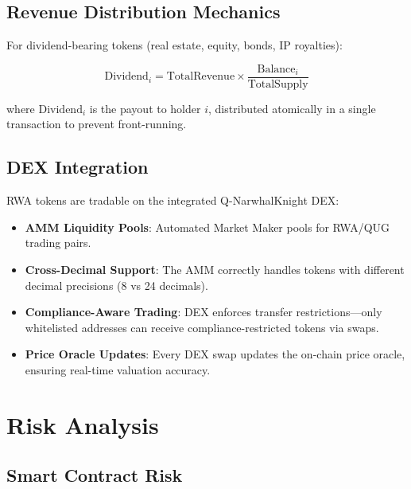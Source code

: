 \documentclass[11pt,a4paper,twoside]{article}
\begin{document}
\subsection{Revenue Distribution Mechanics}

For dividend-bearing tokens (real estate, equity, bonds, IP royalties):

\begin{equation}
\text{Dividend}_i = \text{TotalRevenue} \times \frac{\text{Balance}_i}{\text{TotalSupply}}
\end{equation}

where $\text{Dividend}_i$ is the payout to holder $i$, distributed atomically in a single transaction to prevent front-running.

\subsection{DEX Integration}

RWA tokens are tradable on the integrated Q-NarwhalKnight DEX:

\begin{itemize}
  \item \textbf{AMM Liquidity Pools}: Automated Market Maker pools for RWA/QUG trading pairs.
  \item \textbf{Cross-Decimal Support}: The AMM correctly handles tokens with different decimal precisions (8 vs 24 decimals).
  \item \textbf{Compliance-Aware Trading}: DEX enforces transfer restrictions---only whitelisted addresses can receive compliance-restricted tokens via swaps.
  \item \textbf{Price Oracle Updates}: Every DEX swap updates the on-chain price oracle, ensuring real-time valuation accuracy.
\end{itemize}

\section{Risk Analysis}
\label{sec:risk}

\subsection{Smart Contract Risk}
\end{document}
